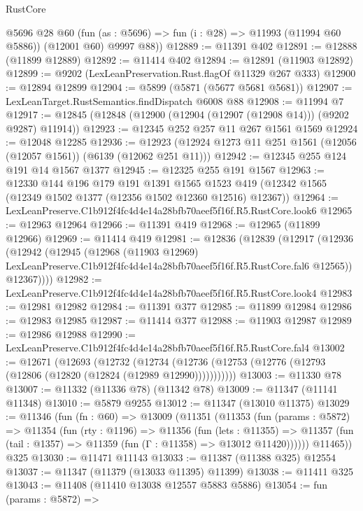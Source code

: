 \begin{lexlean}{RustCore}
\begin{coremodule}
        @5696
        @28
        @60
        (fun (as : @5696) => fun (i : @28) => @11993 (@11994 @60 @5886))
        (@12001 @60)
        @9997
        @88))
@12889 := @11391 @402
@12891 := @12888 (@11899 @12889)
@12892 := @11414 @402
@12894 := @12891 (@11903 @12892)
@12899 := @9202 (LexLeanPreservation.Rust.flagOf @11329 @267 @333)
@12900 := @12894 @12899
@12904 := @5899 (@5871 (@5677 @5681 @5681))
@12907 := LexLeanTarget.RustSemantics.findDispatch @6008 @88
@12908 := @11994 @7
@12917 := @12845 (@12848 (@12900 (@12904 (@12907 (@12908 @14))) (@9202 @9287) @11914))
@12923 := @12345 @252 @257 @11 @267 @1561 @1569
@12924 := @12048 @12285
@12936 := @12923 (@12924 @1273 @11 @251 @1561 (@12056 (@12057 @1561)) (@6139 (@12062 @251 @11)))
@12942 := @12345 @255 @124 @191 @14 @1567 @1377
@12945 := @12325 @255 @191 @1567
@12963 := @12330
    @144
    @196
    @179
    @191
    @1391
    @1565
    @1523
    @419
    (@12342 @1565 (@12349 @1502 @1377 (@12356 @1502 @12360 @12516) @12367))
@12964 := LexLeanPreserve.C1b912f4fc4d4e14a28bfb70aeef5f16f.R5.RustCore.look6
@12965 := @12963 @12964
@12966 := @11391 @419
@12968 := @12965 (@11899 @12966)
@12969 := @11414 @419
@12981 := @12836
    (@12839
      (@12917
        (@12936
          (@12942
            (@12945
              (@12968
                (@11903 @12969)
                LexLeanPreserve.C1b912f4fc4d4e14a28bfb70aeef5f16f.R5.RustCore.fal6
                @12565))
            @12367))))
@12982 := LexLeanPreserve.C1b912f4fc4d4e14a28bfb70aeef5f16f.R5.RustCore.look4
@12983 := @12981 @12982
@12984 := @11391 @377
@12985 := @11899 @12984
@12986 := @12983 @12985
@12987 := @11414 @377
@12988 := @11903 @12987
@12989 := @12986 @12988
@12990 := LexLeanPreserve.C1b912f4fc4d4e14a28bfb70aeef5f16f.R5.RustCore.fal4
@13002 := @12671
    (@12693
      (@12732
        (@12734 (@12736 (@12753 (@12776 (@12793 (@12806 (@12820 (@12824 (@12989 @12990)))))))))))
@13003 := @11330 @78
@13007 := @11332 (@11336 @78) (@11342 @78)
@13009 := @11347 (@11141 @11348)
@13010 := @5879 @9255
@13012 := @11347 (@13010 @11375)
@13029 := @11346
    (fun (fn : @60) =>
    @13009
      (@11351
        (@11353
          (fun (params : @5872) =>
          @11354
            (fun (rty : @1196) =>
            @11356
              (fun (lets : @11355) =>
              @11357 (fun (tail : @1357) => @11359 (fun (Γ : @11358) => @13012 @11420))))))
        @11465))
    @325
@13030 := @11471 @11143
@13033 := @11387 (@11388 @325) @12554
@13037 := @11347 (@11379 (@13033 @11395) @11399)
@13038 := @11411 @325
@13043 := @11408 (@11410 @13038 @12557 @5883 @5886)
@13054 := fun (params : @5872) =>

\end{coremodule}
\end{lexlean}
